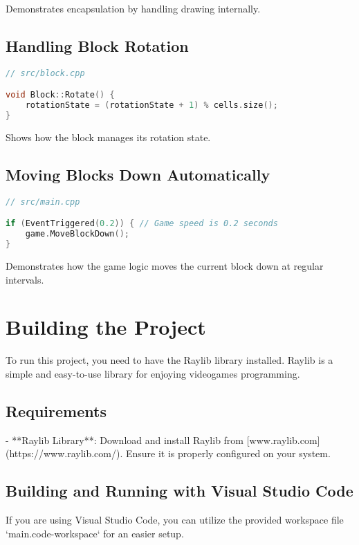 \documentclass{article}
\begin{document}
Demonstrates encapsulation by handling drawing internally.

\subsection{Handling Block Rotation}

\begin{lstlisting}[language=C++]
// src/block.cpp

void Block::Rotate() {
    rotationState = (rotationState + 1) % cells.size();
}
\end{lstlisting}

Shows how the block manages its rotation state.

\subsection{Moving Blocks Down Automatically}

\begin{lstlisting}[language=C++]
// src/main.cpp

if (EventTriggered(0.2)) { // Game speed is 0.2 seconds
    game.MoveBlockDown();
}
\end{lstlisting}

Demonstrates how the game logic moves the current block down at regular intervals.

\section{Building the Project}

To run this project, you need to have the Raylib library installed. Raylib is a simple and easy-to-use library for enjoying videogames programming.

\subsection{Requirements}

- **Raylib Library**: Download and install Raylib from [www.raylib.com](https://www.raylib.com/). Ensure it is properly configured on your system.

\subsection{Building and Running with Visual Studio Code}

If you are using Visual Studio Code, you can utilize the provided workspace file `main.code-workspace` for an easier setup.
\end{document}
